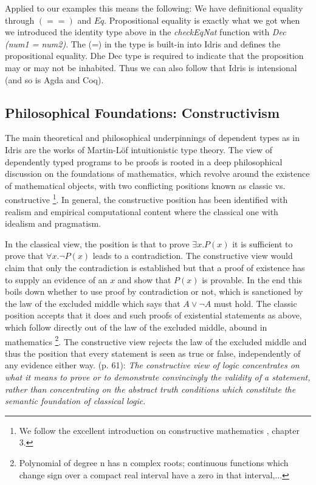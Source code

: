 Applied to our examples this means the following: We have definitional equality through $(==)$ and $Eq$. Propositional equality is exactly what we got when we introduced the identity type above in the \textit{checkEqNat} function with \textit{Dec (num1 = num2)}. The (=) in the type is built-in into Idris and defines the propositional equality. Dhe Dec type is required to indicate that the proposition may or may not be inhabited. Thus we can also follow that Idris is intensional (and so is Agda and Coq).

\subsection{Philosophical Foundations: Constructivism}
\label{sub:dep_foundations}

The main theoretical and philosophical underpinnings of dependent types as in Idris are the works of Martin-L\"of intuitionistic type theory. The view of dependently typed programs to be proofs is rooted in a deep philosophical discussion on the foundations of mathematics, which revolve around the existence of mathematical objects, with two conflicting positions known as classic vs. constructive \footnote{We follow the excellent introduction on constructive mathematics \cite{thompson_type_1991}, chapter 3.}. In general, the constructive position has been identified with realism and empirical computational content where the classical one with idealism and pragmatism.

In the classical view, the position is that to prove $\exists x. P(x)$ it is sufficient to prove that $\forall x. \neg P(x)$ leads to a contradiction. The constructive view would claim that only the contradiction is established but that a proof of existence has to supply an evidence of an $x$ and show that $P(x)$ is provable. In the end this boils down whether to use proof by contradiction or not, which is sanctioned by the law of the excluded middle which says that $A \lor \neg A$ must hold. The classic position accepts that it does and such proofs of existential statements as above, which follow directly out of the law of the excluded middle, abound in mathematics \footnote{Polynomial of degree n has n complex roots; continuous functions which change sign over a compact real interval have a zero in that interval,...}. The constructive view rejects the law of the excluded middle and thus the position that every statement is seen as true or false, independently of any evidence either way. \cite{thompson_type_1991} (p. 61): \textit{The constructive view of logic concentrates on what it means to prove or to demonstrate convincingly the validity of a statement, rather than concentrating on the abstract truth conditions which constitute the semantic foundation of classical logic}.

